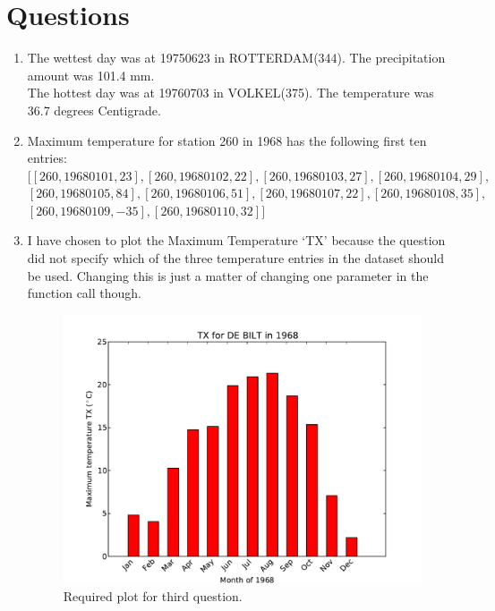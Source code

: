 \documentclass[a4paper]{article}
\begin{document}
\section{Questions}
\begin{enumerate}
\item
The wettest day was at 19750623 in ROTTERDAM(344). The precipitation amount was 101.4 mm. \\
The hottest day was at 19760703 in VOLKEL(375). The temperature was 36.7 degrees Centigrade. \\
\item
Maximum temperature for station 260 in 1968 has the following first ten entries:\\
$[[260, 19680101, 23], [260, 19680102, 22], [260, 19680103, 27], [260, 19680104, 29],$ \\
$[260, 19680105, 84], [260, 19680106, 51], [260, 19680107, 22], [260, 19680108, 35],$\\
$[260, 19680109, -35], [260, 19680110, 32]]$

\item
I have chosen to plot the Maximum Temperature `TX' because the question did not specify which of the three temperature entries in the dataset should be used. Changing this is just a matter of changing one parameter in the function call though.
\begin{figure}[h!] 
\begin{center} 
\includegraphics[scale=0.5]{../Week3/BLAC_hw5_TLRH_6126561_260_TX_1968.pdf} 
\caption{Required plot for third question.}
\end{center} 
\end{figure} 
\end{enumerate}

\newpage




\end{document}
